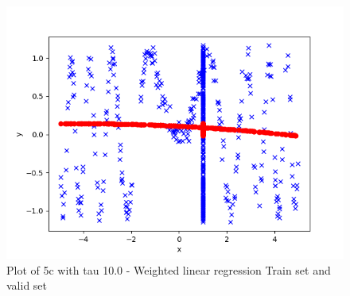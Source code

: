 \begin{answer}
\begin{figure}
  \includegraphics[width=\linewidth]{../src/output/p05c_plot_10_0_tau.png}
  \caption{Plot of 5c with tau 10.0 - Weighted linear regression Train set and valid set}
  \label{fig:Plot of 5c with tau 10.0 - Weighted linear regression Train set and valid set}
\end{figure}
\end{answer}
